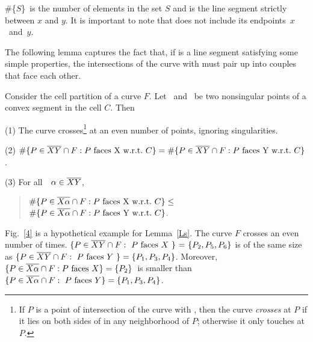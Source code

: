\begin{notation}
\#\{$S$\}\ is the number of elements in the set $S$ and
 is the line segment strictly between $x$ and $y$.
It is important to note that 
 does not include its \mbox{endpoints $x$ and $y$}.
\end{notation}

The following lemma captures the fact that, if \seg{\x\y} is a line segment 
satisfying some simple properties, the intersections of the curve with 
\seg{\x\y} must pair up into couples that face each other.

\begin{lemma}
\label{Ls}
Consider the cell partition of a curve $F$.
Let \x\ and \y\ be two nonsingular points of a convex segment in the 
cell $C$.
Then

{\samepage
{\rm (1)} The curve crosses\footnote{If $P$ is a point of intersection of 
	the curve 
	with \seg{\x\y}, then the curve {\em crosses} \seg{\x\y} at $P$ 
	if it lies 
	on both sides of \seg{\x\y} in any neighborhood of $P$; 
	otherwise it 
	only touches \seg{\x\y} at $P$.}
\seg{\x\y} at an even number of points, ignoring singularities.

}
{\rm (2)} $\#\{P \in \seg{\x\y} \cap F: P \mbox{ faces \x\ w.r.t.\ $C$}\} = 
\#\{P \in \seg{\x\y} \cap F: P \mbox{ faces \y\ w.r.t.\ $C$}\}$.

{\rm (3)} For all\ \ $\alpha \in \mbox{$\overline{XY}$}$,\ \ \nopagebreak 
\begin{quote}
$\#\{P \in\mbox{$\overline{X\alpha}$}\cap F: P \mbox{ faces X\ w.r.t.\ $C$}\} \leq$
$\#\{P \in \mbox{$\overline{X\alpha}$}\cap F: P \mbox{ faces Y\ w.r.t.\ $C$}\}$.
\end{quote}
\end{lemma}

\vspace{.2in}

\begin{example}
{\rm 
Fig.~\ref{4} is a hypothetical example for Lemma~\ref{Ls}.
The curve $F$ crosses \seg{\x\y} an even number of times.
$\{ P \in \mbox{$\overline{XY}$} \cap F:\mbox{ $P$ faces $X$\ \} = 
   \{}P_{2},P_{5},P_{6}\}$
is of the same size as 
$\{ P \in \mbox{$\overline{XY}$} \cap F:\mbox{ $P$ faces $Y$ } \} = 
    \{P_{1},P_{3},P_{4}\}$.
Moreover,
$\{ P \in \mbox{$\overline{X\alpha}$} \cap F: \mbox{$P$ faces $X$} \} = \{P_{2}\}$\ 
is smaller than
$\{ P \in \mbox{$\overline{X\alpha}$} \cap F: \mbox{ $P$ faces $Y$} \} = 
   \{P_{1},P_{3},P_{4}\}$.
}
\end{example}
%

